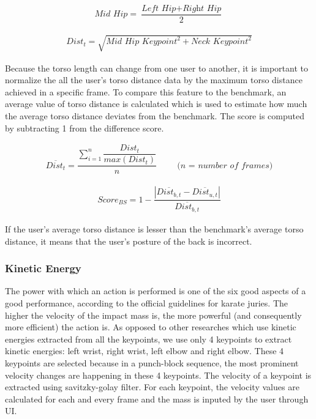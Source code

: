 \begin{gather}
  \textit{Mid Hip} = \dfrac{\textit{Left Hip} + \textit{Right Hip}}{2}
  \label{eq:midhip}
\end{gather}

\begin{gather}
  Dist_t = \sqrt{\textit{Mid Hip Keypoint}^2 + \textit{Neck Keypoint}^2}
  \label{eq:torsoDistance}
\end{gather}

Because the torso length can change from one user to another, it is important to normalize the all the user's torso distance data by the maximum torso distance achieved in a specific frame. To compare this feature to the benchmark, an average value of torso distance is calculated which is used to estimate how much the average torso distance deviates from the benchmark. The score is computed by subtracting 1 from the difference score. 

\begin{gather}
  \overline{Dist_t} = \dfrac{ \sum_{i=1}^n \dfrac{Dist_t}{max(Dist_t)}}{n} \hspace{1cm} \textit{(n = number of frames)}
  \label{eq:avgTorsoDist}
\end{gather}

\begin{gather}
  Score_{BS} = 1 - \dfrac{|\overline{Dist_{b,t}} - \overline{Dist_{u,t}}|} { \overline{Dist_{b,t}}}
  \label{eq:torsoScore}
\end{gather}

If the user's average torso distance is lesser than the benchmark's average torso distance, it means that the user's posture of the back is incorrect. 

\subsubsection{Kinetic Energy}

The power with which an action is performed is one of the six good aspects of a good performance, according to the official guidelines for karate juries. The higher the velocity of the
impact mass is, the more powerful (and consequently more efficient) the action is. As opposed to other researches which use kinetic energies extracted from all the keypoints, we use only 4 keypoints to extract kinetic energies: left wrist, right wrist, left elbow and right elbow. These 4 keypoints are selected because in a punch-block sequence, the most prominent velocity changes are happening in these 4 keypoints. The velocity of a keypoint is extracted using savitzky-golay filter. For each keypoint, the velocity values are calculated for each and every frame and the mass is inputed by the user through UI. 

